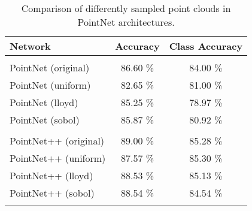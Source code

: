 \begin{table}[]
	\centering
	\begin{tabular}{lcc}
		\hline
		\textbf{Network}      & \textbf{ Accuracy } & \textbf{Class Accuracy} \\ \hline
		                      &                     &                         \\
		PointNet (original)   &      86.60 \%       &        84.00 \%         \\
		PointNet (uniform)    &      82.65 \%       &        81.00 \%         \\
		PointNet (lloyd)      &      85.25 \%       &        78.97 \%         \\
		PointNet (sobol)      &      85.87 \%       &        80.92 \%         \\
		                      &                     &                         \\
		PointNet++ (original) &      89.00 \%       &        85.28 \%         \\
		PointNet++ (uniform)  &      87.57 \%       &        85.30 \%         \\
		PointNet++ (lloyd)    &      88.53 \%       &        85.13 \%         \\
		PointNet++ (sobol)    &      88.54 \%       &        84.54 \%         \\
		                      &                     &                         \\ \hline
	\end{tabular}
\caption{Comparison of differently sampled point clouds in PointNet architectures.}
\label{Table:pn}
\end{table}